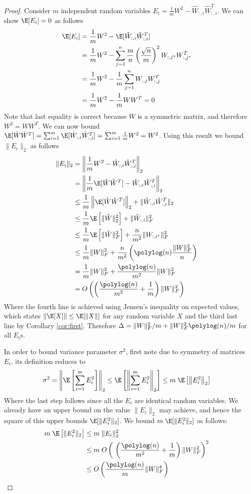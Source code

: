 \documentclass{sig-alternate}
\begin{document}
\begin{proof}
Consider $m$ independent random variables $E_i = \frac{1}{m} W^2 - \hat{W}_{:,i}\hat{W}_{:,i}^T$. We can show $\E[E_i] = 0$ as follows
\begin{align*}
\E[E_i] &= \frac{1}{m} W^2 - \E[\hat{W}_{:,i}\hat{W}_{:,i}^T]\\
&= \frac{1}{m} W^2 - \sum_{j=1}^n \frac{m}{n} \left(\frac{\sqrt{n}}{m} \right)^2 W_{:,j^*} W_{:,j^*}^T\\
&= \frac{1}{m} W^2 - \frac{1}{m} \sum_{j=1}^n W_{:,j}W_{:,j}^T \\
&= \frac{1}{m} W^2 - \frac{1}{m} WW^T = 0
\end{align*}
Note that last equality is correct because $W$ is a symmetric matrix, and therefore $W^2 = WW^T$.
We can now bound $\E[\hat W \hat{W}^T] = \sum_{i=1}^m \E[\hat{W}_{:,i}\hat{W}_{:,i}^T] = \sum_{i=1}^m \frac{1}{m} W^2 = W^2$. Using this result we bound $\|E_i\|_2$ as follows
\begin{align*}
\|E_i\|_2 &= \left\|\frac{1}{m} W^2 - \hat{W}_{:,i}\hat{W}_{:,i}^T \right\|_2 \\
&=
\left\|\frac{1}{m} \E[\hat{W}\hat{W}^T] - \hat{W}_{:,i}\hat{W}_{:,i}^T\right\|_2 \\
&\leq 
\frac{1}{m} \left\|\E[\hat{W}\hat{W}^T]\right\|_2 + \|\hat{W}_{:,i}\hat{W}_{:,i}^T\|_2 \\
&\leq 
\frac{1}{m} \E\left[\|\hat{W}\|_2^2\right] + \|\hat{W}_{:,i}\|_F^2  \\
&\leq 
\frac{1}{m} \E\left[\|\hat{W}\|_F^2\right] + \frac{n}{m^2} \|W_{:,i^*}\|_F^2 \\
&\leq 
\frac{1}{m} \|W\|_F^2 + \frac{n}{m^2} \left(\polylog(n)\frac{\|W\|_F^2}{n}  \right) \\
&= \frac{1}{m}\|W\|_F^2 + \frac{\polylog(n)}{m^2}\|W\|_F^2 \\
&= O \left( \left(\frac{\polylog(n)}{m^2} + \frac{1}{m}  \right)\|W\|_F^2 \right)
\end{align*}
Where the fourth line is achieved using Jensen's inequality on expected values, which states $\|\E[X]\| \leq \E[\|X\|]$ for any random variable $X$ and the third last line by Corollary \ref{cor:first}. 
Therefore $\Delta = \|W\|_F^2/m + \|W\|_F^2 \polylog(n)/m$ for all $E_i$s.

In order to bound variance parameter $\sigma^2$, first note due to symmetry of matrices $E_i$, its definition reduces to 
\[
\sigma^2 = \left\|\E\left[\sum_{i=1}^m E_i^2\right]\right\|_2 \leq \E \left[ \left\| \sum_{i=1}^m E_i^2 \right\|_2\right] \leq m\; \E \left[ \left\|E_i^2 \right\|_2\right]
\]
Where the last step follows since all the $E_i$ are identical random variables. We already have an upper bound on the value $\|E_i \|_2$ may achieve, and hence the square of this upper bounds $\E [\|E_i^2 \|_2]$. We bound $m\; \E[ \|E_i^2\|_2]$ as follows:
\begin{align*}
m\; \E \left[ \| E_i^2 \|_2  \right] &\leq m\; \|E_i \|_2^2  \\ 
& \leq  m\; O \left(\ \left(\frac{\polylog(n)}{m^2} + \frac{1}{m} \right) \|W\|_F^2 \right)^2\\
& \leq  O \left(\frac{\polylog(n)}{m}\|W\|_F^4 \right)
\end{align*}



\end{proof}
\end{document}
